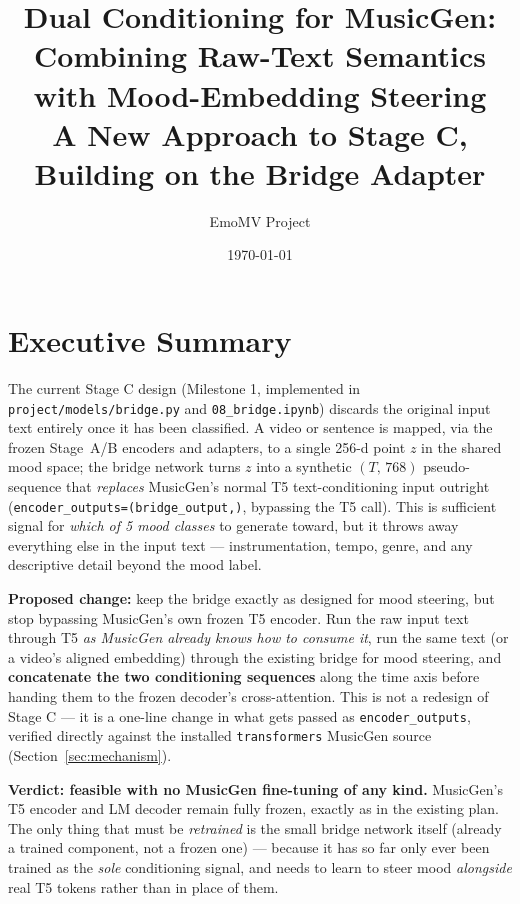 \documentclass[11pt]{article}
\title{\textbf{Dual Conditioning for MusicGen: Combining Raw-Text Semantics\\ with Mood-Embedding Steering}\\
\large A New Approach to Stage C, Building on the Bridge Adapter}
\author{EmoMV Project}
\date{\today}
\begin{document}
\maketitle
\tableofcontents

\section*{Executive Summary}

The current Stage C design (Milestone 1, implemented in \texttt{project/models/bridge.py} and
\texttt{08\_bridge.ipynb}) discards the original input text entirely once it has been classified.
A video or sentence is mapped, via the frozen Stage~A/B encoders and adapters, to a single 256-d
point $z$ in the shared mood space; the bridge network turns $z$ into a synthetic
$(T,\,768)$ pseudo-sequence that \emph{replaces} MusicGen's normal T5 text-conditioning input
outright (\texttt{encoder\_outputs=(bridge\_output,)}, bypassing the T5 call). This is sufficient
signal for \emph{which of 5 mood classes} to generate toward, but it throws away everything else
in the input text --- instrumentation, tempo, genre, and any descriptive detail beyond the mood
label.

\textbf{Proposed change:} keep the bridge exactly as designed for mood steering, but stop
bypassing MusicGen's own frozen T5 encoder. Run the raw input text through T5 \emph{as MusicGen
already knows how to consume it}, run the same text (or a video's aligned embedding) through the
existing bridge for mood steering, and \textbf{concatenate the two conditioning sequences} along
the time axis before handing them to the frozen decoder's cross-attention. This is not a redesign
of Stage C --- it is a one-line change in what gets passed as \texttt{encoder\_outputs}, verified
directly against the installed \texttt{transformers} MusicGen source (Section~\ref{sec:mechanism}).

\textbf{Verdict: feasible with no MusicGen fine-tuning of any kind.} MusicGen's T5 encoder and LM
decoder remain fully frozen, exactly as in the existing plan. The only thing that must be
\emph{retrained} is the small bridge network itself (already a trained component, not a frozen
one) --- because it has so far only ever been trained as the \emph{sole} conditioning signal, and
needs to learn to steer mood \emph{alongside} real T5 tokens rather than in place of them.
\end{document}
